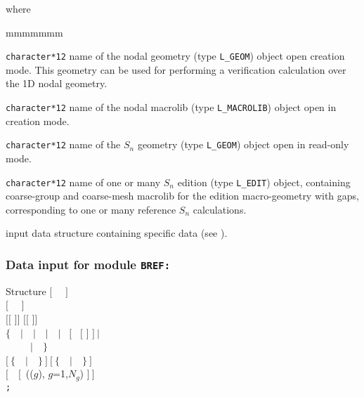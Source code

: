 \noindent where
\begin{ListeDeDescription}{mmmmmmm}

\item[\dusa{GEOM}] {\tt character*12} name of the nodal {\sc geometry} (type {\tt L\_GEOM}) object open creation mode. This geometry can be used for
performing a verification calculation over the 1D nodal geometry.

\item[\dusa{MACRO}] {\tt character*12} name of the nodal {\sc macrolib} (type {\tt L\_MACROLIB}) object open in creation mode.

\item[\dusa{GEOM\_SN}] {\tt character*12} name of the $S_n$ {\sc geometry} (type {\tt L\_GEOM}) object open in read-only mode.

\item[\dusa{EDIT\_SN}] {\tt character*12} name of one or many $S_n$ {\sc edition} (type {\tt L\_EDIT}) object, containing coarse-group and
coarse-mesh {\sc macrolib} for the edition {\sc macro-geometry} with gaps, corresponding to one or many reference $S_n$ calculations.

\item[\dusa{BREF\_data}] input data structure containing specific data (see ).

\end{ListeDeDescription}
\clearpage

\subsubsection{Data input for module {\tt BREF:}}\label{sect:descBREF}

\begin{DataStructure}{Structure }
$[$~ ~$]$ \\
$[$~ ~$]$ \\
 $[[$  $]]$  $[[$  $]]$ \\
 $\{$~~$|$~~$|$~~$|$~~$|$~  
$[$~ $[$  $]$  $]~|$ \\
~~~~~$|$~~$\}$ \\
$[~\{$~~$|$~~$\}~]~[~\{$~~$|$~~$\}~]$ \\
$[$~~$[$~(($g$), $g$=1,$N_g$) $]~]$ \\
{\tt ;}
\end{DataStructure}

